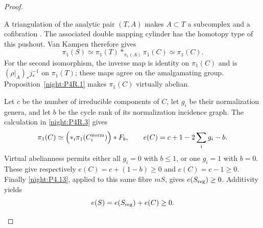 \begin{proof}
\begin{enumerate}[label=\arabic*.,leftmargin=*]
A triangulation of the analytic pair $(T,A)$ makes
$A\subset T$ a subcomplex and a cofibration
\cite[Theorem~2, p.~464]{Lojasiewicz1964}.
The associated double mapping cylinder has the homotopy
type of this pushout. Van Kampen therefore gives
\[
 \pi_1(S)\simeq
 \pi_1(T)*_{\pi_1(A)}\pi_1(C)\simeq\pi_1(C).
\]
For the second isomorphism, the inverse map is identity
on $\pi_1(C)$ and is $(\rho|_A)_*j_*^{-1}$ on
$\pi_1(T)$; these maps agree on the amalgamating group.
Proposition~\ref{night:P4R.1} makes $\pi_1(C)$ virtually abelian.

Let $c$ be the number of irreducible
components of $C$, let $g_i$ be their normalization genera,
and let $b$ be the cycle rank of its normalization incidence
graph. The calculation in \cref{night:P4R.3} gives
\[
 \pi_1(C)\simeq
   \Bigl(*_i\pi_1(C_i^{\rm norm})\Bigr)*F_b,
 \qquad e(C)=c+1-2\sum_i g_i-b.
\]
Virtual abelianness permits either all $g_i=0$ with
$b\le1$, or one $g_i=1$ with $b=0$. These give respectively
$e(C)=c+(1-b)\ge0$ and $e(C)=c-1\ge0$.
Finally \cref{night:P4.13}, applied to this same fibre $mS$,
gives $e(S_{\rm reg})\ge0$. Additivity yields
\[
 e(S)=e(S_{\rm reg})+e(C)\ge0.
\]
\end{enumerate}
\end{proof}